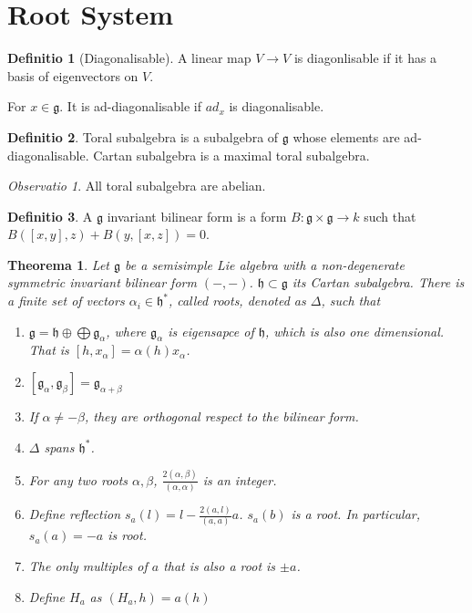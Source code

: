 \documentclass[12pt, a4paper]{article}
\newtheorem{theorem}{Theorema}[section]
\theoremstyle{definition}
\newtheorem{definition}{Definitio}[section]
\theoremstyle{remark}
\newtheorem{remark}{Observatio}[section]
\newcommand{\mf}[1]{\mathfrak{#1}}
\begin{document}
\section{Root System}

\begin{definition}[Diagonalisable]
	A linear map $V \rightarrow V$ is diagonlisable if it has a basis of eigenvectors on $V$.

	For $x \in \mf{g}$. It is ad-diagonalisable if $ad_x$ is diagonalisable.
\end{definition}

\begin{definition}
	Toral subalgebra is a subalgebra of $\mf{g}$ whose elements are ad-diagonalisable.
	Cartan subalgebra is a maximal toral subalgebra.
\end{definition}

\begin{remark}
	All toral subalgebra are abelian.
\end{remark}

\begin{definition}
	A $\mf{g}$ invariant bilinear form is a form $B: \mf{g} \times \mf{g} \rightarrow k$ such that $B([x,y], z) + B(y, [x,z]) = 0$.
\end{definition}

\begin{theorem}
	Let $\mf{g}$ be a semisimple Lie algebra with a non-degenerate symmetric invariant bilinear form $(-,-)$.
	$\mf{h}\subset \mf{g}$ its Cartan subalgebra. 
	There is a finite set of vectors $\alpha_i \in \mf{h}^*$, called roots, denoted as $\Delta$, such that

\begin{enumerate}
	\item $\mf{g} = \mf{h} \oplus \bigoplus \mf{g}_{\alpha}$, where $\mf{g}_{\alpha} $ is eigensapce of $\mf{h}$, which is also one dimensional. That is $[h, x_{\alpha}] = \alpha(h)x_{\alpha}$.
	\item $[\mf{g}_{\alpha}, \mf{g}_{\beta}] = \mf{g}_{\alpha + \beta}$
	\item If $\alpha \neq -\beta$, they are orthogonal respect to the bilinear form.
	\item $\Delta$ spans $\mf{h}^*$.
	\item For any two roots $\alpha, \beta$, $\frac{2(\alpha, \beta)}{(\alpha, \alpha)}$ is an integer.
	\item Define reflection $s_{a}(l) = l - \frac{2(a,l)}{(a,a)}a$. $s_a(b)$ is a root. In particular, $s_a(a) = -a$ is root.
	\item The only multiples of $a$ that is also a root is $\pm a$.
	\item Define $H_a$ as $(H_a, h) =a(h)$
\end{enumerate}
\end{theorem}
\end{document}
